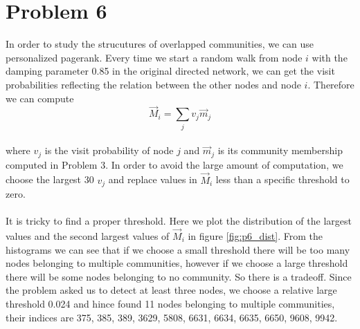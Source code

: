 \documentclass{article}
\begin{document}
\section{Problem 6}
In order to study the strucutures of overlapped communities, we can use personalized pagerank. Every time we start a random walk from node $i$ with the damping parameter 0.85 in the original directed network, we can get the visit probabilities reflecting the relation between the other nodes and node $i$. Therefore we can compute\\
\begin{equation*}
\vec{M}_i=\sum_jv_j\vec{m}_j
\end{equation*}
\\
where $v_j$ is the visit probability of node $j$ and $\vec{m}_j$ is its community membership computed in Problem 3. In order to avoid the large amount of computation, we choose the largest 30 $v_j$ and replace values in $\vec{M}_i$ less than a specific threshold to zero.\\
\\
It is tricky to find a proper threshold. Here we plot the distribution of the largest values and the second largest values of $\vec{M}_i$ in figure \ref{fig:p6_dist}. From the histograms we can see that if we choose a small threshold there will be too many nodes belonging to multiple communities, however if we choose a large threshold there will be some nodes belonging to no community. So there is a tradeoff. Since the problem asked us to detect at least three nodes, we choose a relative large threshold 0.024 and hince found 11 nodes belonging to multiple communities, their indices are 375, 385, 389, 3629, 5808, 6631, 6634, 6635, 6650, 9608, 9942.
\end{document}

